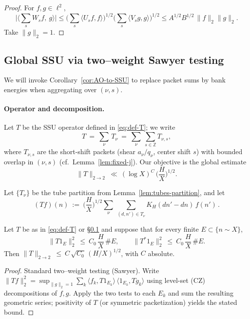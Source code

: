 \begin{proof}
For $f,g\in\ell^2$,
\[
\big|\langle \sum_s W_s f,\ g\rangle\big|
\le \Big(\sum_s \langle U_s f,f\rangle\Big)^{1/2}\Big(\sum_s \langle V_s g,g\rangle\Big)^{1/2}
\le A^{1/2}B^{1/2}\,\|f\|_2\|g\|_2.
\]
Take $\|g\|_2=1$.
\end{proof}

\subsection{Global SSU via two–weight Sawyer testing}\label{subsec:sawyer}

We will invoke Corollary~\ref{cor:AO-to-SSU} to replace packet sums by bank energies when aggregating over $(\nu,s)$.

\paragraph{Operator and decomposition.}
Let $T$ be the SSU operator defined in \eqref{eq:def-T}; we write
\[
T\ =\ \sum_{\nu}\,T_\nu\ =\ \sum_{\nu}\ \sum_{s\in\mathbb Z} T_{\nu,s},
\]
where $T_{\nu,s}$ are the short-shift packets (shear $a_\nu/q_\nu$, center shift $s$) with bounded overlap in $(\nu,s)$ (cf.\ Lemma~\ref{lem:fixed-j}). Our objective is the global estimate
\begin{equation}\label{eq:sawyer-goal}
\|T\|_{2\to 2}\ \ll\ (\log X)^C\,\Big(\frac{H}{X}\Big)^{1/2}.
\end{equation}

Let $\{T_\nu\}$ be the tube partition from Lemma~\ref{lem:tubes-partition}, and let
\[
(Tf)(n)\ :=\ \Big(\frac{H}{X}\Big)^{1/2}\sum_{\nu}\ \sum_{(d,n')\in T_\nu} K_H(dn'-dn)\,f(n')\,.
\]

\begin{proposition}\label{prop:sawyer-reduction}
Let $T$ be as in \eqref{eq:def-T} or \S\ref{subsec:sawyer} and suppose that for every finite $E\subset\{n\sim X\}$,
\[
\|T1_E\|_2^2\ \le\ C_0\,\frac{H}{X}\,\#E,\qquad
\|T^\ast 1_E\|_2^2\ \le\ C_0\,\frac{H}{X}\,\#E.
\]
Then $\|T\|_{2\to2}\ \le\ C\,\sqrt{C_0}\,(H/X)^{1/2}$, with $C$ absolute.
\end{proposition}

\begin{proof}
Standard two–weight testing (Sawyer). Write $\|Tf\|_2^2=\sup_{\|g\|_2=1}\sum_k \langle f_k, T1_{E_k}\rangle\,\langle 1_{E_k},Tg_k\rangle$ using level-set (CZ) decompositions of $f,g$.
Apply the two tests to each $E_k$ and sum the resulting geometric series; positivity of $T$ (or symmetric packetization) yields the stated bound.
\end{proof}

